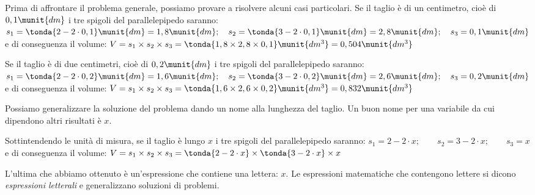 Prima di affrontare il problema generale, possiamo provare a risolvere 
alcuni casi particolari.
Se il taglio è di un centimetro, cioè di \(0,1\munit{dm}\) i tre spigoli 
del parallelepipedo saranno: \\
\(s_1 = \tonda{2 - 2 \cdot 0,1}\munit{dm} = 1,8\munit{dm}; \quad 
  s_2 = \tonda{3 - 2 \cdot 0,1}\munit{dm} = 2,8\munit{dm}; \quad 
  s_3 = 0,1\munit{dm}\)\\
e di conseguenza il volume: \quad
\(V = s_1  \times s_2 \times s_3 = 
  \tonda{1,8 \times 2,8 \times 0,1} \munit{dm^3} = 0,504\munit{dm^3}\)

Se il taglio è di due centimetri, cioè di \(0,2\munit{dm}\) i tre spigoli 
del parallelepipedo saranno: \\
\(s_1 = \tonda{2 - 2 \cdot 0,2}\munit{dm} = 1,6\munit{dm}; \quad 
  s_2 = \tonda{3 - 2 \cdot 0,2}\munit{dm} = 2,6\munit{dm}; \quad 
  s_3 = 0,2\munit{dm}\)\\
e di conseguenza il volume: \quad
\(V = s_1  \times s_2 \times s_3 = 
  \tonda{1,6 \times 2,6 \times 0,2} \munit{dm^3} = 0,832\munit{dm^3}\)

Possiamo generalizzare la soluzione del problema dando un nome alla 
lunghezza del taglio. 
Un buon nome per una variabile da cui dipendono altri risultati è \(x\).

Sottintendendo le unità di misura, se il taglio è lungo \(x\) 
i tre spigoli del parallelepipedo saranno: \qquad
\(s_1 = 2 - 2 \cdot x; \qquad 
  s_2 = 3 - 2 \cdot x; \qquad 
  s_3 = x\)\\
e di conseguenza il volume: \qquad
\(V = s_1  \times s_2 \times s_3 = 
  \tonda{2 - 2 \cdot x} \times \tonda{3 - 2 \cdot x} \times x 
\)

L'ultima che abbiamo ottenuto è un'espressione che contiene una lettera: 
\(x\). 
Le espressioni matematiche che contengono lettere si dicono 
\emph{espressioni letterali} e generalizzano 
soluzioni di problemi.

